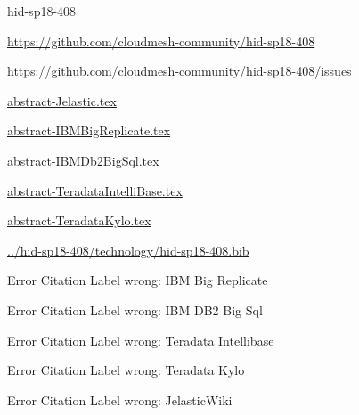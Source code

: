 \begin{IU}

hid-sp18-408

\url{https://github.com/cloudmesh-community/hid-sp18-408}

\url{https://github.com/cloudmesh-community/hid-sp18-408/issues}

\href{https://github.com/cloudmesh-community/hid-sp18-408/blob/master//technology/abstract-Jelastic.tex}{abstract-Jelastic.tex}

\href{https://github.com/cloudmesh-community/hid-sp18-408/blob/master//technology/abstract-IBMBigReplicate.tex}{abstract-IBMBigReplicate.tex}

\href{https://github.com/cloudmesh-community/hid-sp18-408/blob/master//technology/abstract-IBMDb2BigSql.tex}{abstract-IBMDb2BigSql.tex}

\href{https://github.com/cloudmesh-community/hid-sp18-408/blob/master//technology/abstract-TeradataIntelliBase.tex}{abstract-TeradataIntelliBase.tex}

\href{https://github.com/cloudmesh-community/hid-sp18-408/blob/master//technology/abstract-TeradataKylo.tex}{abstract-TeradataKylo.tex}

\href{https://github.com/cloudmesh-community/hid-sp18-408/blob/master//technology/hid-sp18-408.bib}{../hid-sp18-408/technology/hid-sp18-408.bib}

 Error Citation Label wrong: IBM Big Replicate

 Error Citation Label wrong: IBM DB2 Big Sql

 Error Citation Label wrong: Teradata Intellibase

 Error Citation Label wrong: Teradata Kylo

 Error Citation Label wrong: JelasticWiki

\end{IU}


